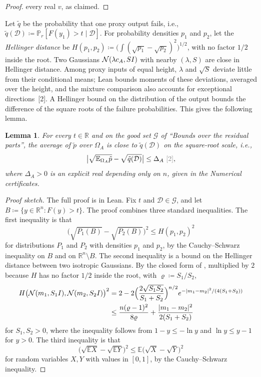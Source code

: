 \documentclass[10pt]{article}
\newcommand{\leanmark}[1]{{\relscale{0.78}\color{gray}[#1]}}
\newtheorem{lemma}{Lemma}
\newcommand{\RR}{\mathbb{R}}
\newcommand{\Dd}{\mathcal{D}}\newcommand{\Ee}{\mathcal{E}}
\newcommand{\Gg}{\mathcal{G}}\newcommand{\Hh}{\mathcal{H}}
\newcommand{\EE}{\mathbb{E}}
\newcommand{\PP}{\mathbb{P}}
\begin{document}
\begin{enumerate}[leftmargin=*,itemsep=8pt,topsep=10pt plus 2pt]
\begin{proof}
  every real $v$, as claimed.
  \end{proof}
  Let $\tilde q$ be the probability that one proxy output fails, i.e.,
  $\tilde q(\Dd)\coloneqq \PP_r[F(y_1)>t\mid\Dd]$. For probability
  densities $p_1$ and $p_2$, let the \emph{Hellinger distance} be
  $H(p_1,p_2)\coloneqq\bigl(\int(\sqrt{p_1}-\sqrt{p_2})^2\bigr)^{1/2}$, with
  no factor $1/2$ inside the root. Two Gaussians
  $\mathcal{N}(\lambda c_A,SI)$ with nearby $(\lambda,S)$ are close in Hellinger
  distance. Among proxy inputs of equal height, $\lambda$ and $\sqrt S$ deviate
  little from their conditional means; Lean bounds moments of these
  deviations, averaged over the height, and the mixture comparison also
  accounts for exceptional directions~\leanmark{2}. A Hellinger bound on
  the distribution of the output bounds the difference of the square roots of
  the failure probabilities. This gives the following lemma.
  \begin{lemma}\label{lem:da}
    For every $t\in\RR$ and on the good set $\Gg$ of ``Bounds over the residual
    parts'', the average of $\tilde p$ over $\Omega_A$ is close to
    $\tilde q(\Dd)$ on the square-root scale, i.e.,
    \[\bigl|\sqrt{\EE_{\Omega_A}\tilde p}-\sqrt{\tilde q(\Dd)}\bigr|\le\Delta_A~\leanmark{2},\]
    where $\Delta_A>0$ is an explicit real depending only on $n$, given in the
    Numerical certificates.
  \end{lemma}
  \begin{proof}[Proof sketch]
  The full proof is in Lean. Fix $t$ and $\Dd\in\Gg$, and let
  $B\coloneqq\{y\in\RR^n:F(y)>t\}$. The proof combines three standard
  inequalities. The first inequality is that
  \begin{equation}\label{eq:hellevent}
  \bigl(\sqrt{P_1(B)}-\sqrt{P_2(B)}\bigr)^2\le H(p_1,p_2)^2
  \end{equation}
  for distributions $P_1$ and $P_2$ with densities $p_1$ and $p_2$, by the
  Cauchy--Schwarz inequality on $B$ and on $\RR^n\setminus B$. The second
  inequality is a bound on the Hellinger distance between two isotropic
  Gaussians. By the closed form of \citet[Section~2]{dmr-2022}, multiplied
  by $2$ because $H$ has no factor $1/2$ inside the root, with $\varrho\coloneqq S_1/S_2$,
  \begin{equation}\label{eq:hellgauss}
  \begin{aligned}
  H\bigl(\mathcal{N}(m_1,S_1I),\mathcal{N}(m_2,S_2I)\bigr)^2
  &=2-2\Bigl(\frac{2\sqrt{S_1S_2}}{S_1+S_2}\Bigr)^{n/2}
  e^{-|m_1-m_2|^2/(4(S_1+S_2))}\\
  &\le\frac{n(\varrho-1)^2}{8\varrho}+\frac{|m_1-m_2|^2}{2(S_1+S_2)}
  \end{aligned}
  \end{equation}
  for $S_1,S_2>0$, where the inequality follows from $1-y\le-\ln y$ and
  $\ln y\le y-1$ for $y>0$. The third inequality is that
  \begin{equation}\label{eq:hellmix}
  \bigl(\sqrt{\EE X}-\sqrt{\EE Y}\bigr)^2\le\EE\bigl(\sqrt X-\sqrt Y\bigr)^2
  \end{equation}
  for random variables $X,Y$ with values in $[0,1]$, by the Cauchy--Schwarz
  inequality.


\end{proof}
\end{enumerate}
\end{document}
